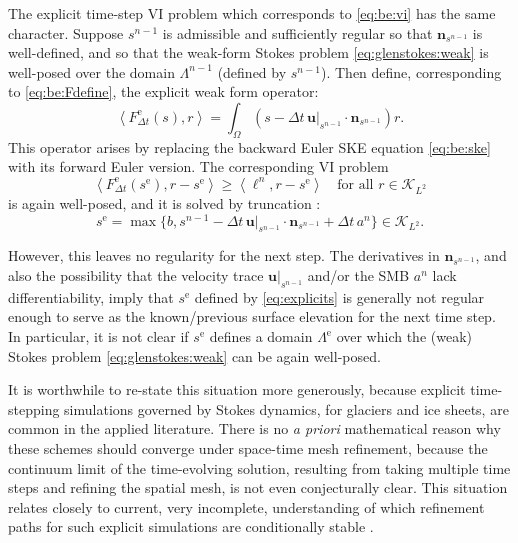 \documentclass[hidelinks,onefignum,onetabnum,final]{siamart220329}  %
\newcommand{\bn}{\mathbf{n}}
\newcommand{\bu}{\mathbf{u}}
\newcommand{\cK}{\mathcal{K}}
\newcommand{\ip}[2]{\left<#1,#2\right>}
\begin{document}
The explicit time-step VI problem which corresponds to \eqref{eq:be:vi} has the same character.  Suppose $s^{n-1}$ is admissible and sufficiently regular so that $\bn_{s^{n-1}}$ is well-defined, and so that the weak-form Stokes problem \eqref{eq:glenstokes:weak} is well-posed over the domain $\Lambda^{n-1}$ (defined by $s^{n-1}$).  Then define, corresponding to \eqref{eq:be:Fdefine}, the explicit weak form operator:
\begin{equation}
\ip{F^{\text{e}}_{\Delta t}(s)}{r} = \int_\Omega \left(s - \Delta t\, \bu|_{s^{n-1}} \cdot \bn_{s^{n-1}}\right) r.  \label{eq:explicitFdefine}
\end{equation}
This operator arises by replacing the backward Euler SKE equation \eqref{eq:be:ske} with its forward Euler version.  The corresponding VI problem
\begin{equation}
\ip{F^{\text{e}}_{\Delta t}(s^{\text{e}})}{r-s^{\text{e}}} \ge \ip{\ell^n}{r-s^{\text{e}}} \quad \text{for all } r \in \cK_{L^2}
\end{equation}
is again well-posed, and it is solved by truncation \cite[section II.3]{KinderlehrerStampacchia1980}:
\begin{equation}
s^{\text{e}} = \max\{b, s^{n-1} - \Delta t\, \bu|_{s^{n-1}} \cdot \bn_{s^{n-1}} + \Delta t\,a^n\} \in \cK_{L^2}. \label{eq:explicits}
\end{equation}

However, this leaves no regularity for the next step.  The derivatives in $\bn_{s^{n-1}}$, and also the possibility that the velocity trace $\bu|_{s^{n-1}}$ and/or the SMB $a^n$ lack differentiability, imply that $s^{\text{e}}$ defined by \eqref{eq:explicits} is generally not regular enough to serve as the known/previous surface elevation for the next time step.  In particular, it is not clear if $s^{\text{e}}$ defines a domain $\Lambda^{\text{e}}$ over which the (weak) Stokes problem \eqref{eq:glenstokes:weak} can be again well-posed.

It is worthwhile to re-state this situation more generously, because explicit time-stepping simulations governed by Stokes dynamics, for glaciers and ice sheets, are common in the applied literature.  There is no \emph{a priori} mathematical reason why these schemes should converge under space-time mesh refinement, because the continuum limit of the time-evolving solution, resulting from taking multiple time steps and refining the spatial mesh, is not even conjecturally clear.  This situation relates closely to current, very incomplete, understanding of which refinement paths for such explicit simulations are conditionally stable \cite[and references therein]{Bueler2023,Chengetal2017,LofgrenAhlkronaHelanow2022}.
\end{document}
